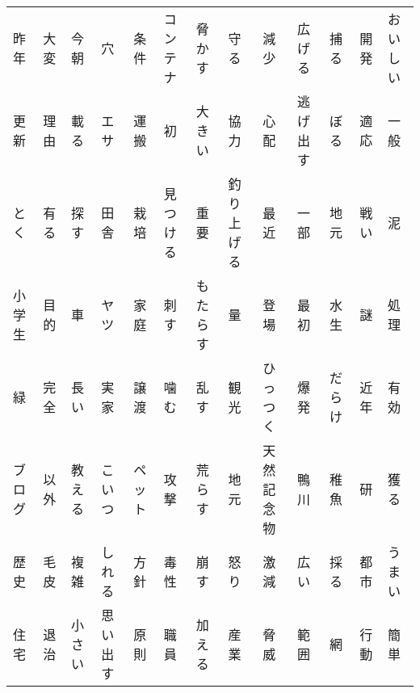 \begin{table}[ht]
\begin{tabular}{lllllllllllll}
  昨年 & 大変 & 今朝 & 穴 & 条件 & コンテナ & 脅かす & 守る & 減少 & 広げる & 捕る & 開発 & おいしい \\ 
  更新 & 理由 & 載る & エサ & 運搬 & 初 & 大きい & 協力 & 心配 & 逃げ出す & ぼる & 適応 & 一般 \\ 
  とく & 有る & 探す & 田舎 & 栽培 & 見つける & 重要 & 釣り上げる & 最近 & 一部 & 地元 & 戦い & 泥 \\ 
  小学生 & 目的 & 車 & ヤツ & 家庭 & 刺す & もたらす & 量 & 登場 & 最初 & 水生 & 謎 & 処理 \\ 
  緑 & 完全 & 長い & 実家 & 譲渡 & 噛む & 乱す & 観光 & ひっつく & 爆発 & だらけ & 近年 & 有効 \\ 
  ブログ & 以外 & 教える & こいつ & ペット & 攻撃 & 荒らす & 地元 & 天然記念物 & 鴨川 & 稚魚 & 研 & 獲る \\ 
  歴史 & 毛皮 & 複雑 & しれる & 方針 & 毒性 & 崩す & 怒り & 激減 & 広い & 採る & 都市 & うまい \\ 
  住宅 & 退治 & 小さい & 思い出す & 原則 & 職員 & 加える & 産業 & 脅威 & 範囲 & 網 & 行動 & 簡単 \\ 
   \hline
\end{tabular}
\end{table}
